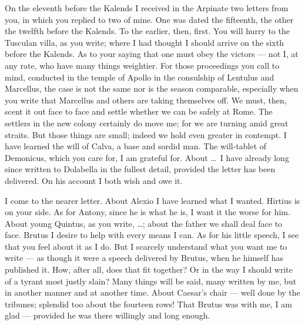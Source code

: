 

 On the eleventh before the Kalends I received in the Arpinate two letters from you, in which you replied to two of mine. One was dated the fifteenth, the other the twelfth before the Kalends. To the earlier, then, first. You will hurry to the Tusculan villa, as you write; where I had thought I should arrive on the sixth before the Kalends. As to your saying that one must obey the victors --- not I, at any rate, who have many things weightier. For those proceedings you call to mind, conducted in the temple of Apollo in the consulship of Lentulus and Marcellus, the case is not the same nor is the season comparable, especially when you write that Marcellus and others are taking themselves off. We must, then, scent it out face to face and settle whether we can be safely at Rome. The settlers in the new colony certainly do move me; for we are turning amid great straits. But those things are small; indeed we hold even greater in contempt. I have learned the will of Calva, a base and sordid man. The will-tablet of Demonicus, which you care for, I am grateful for. About \dots\ I have already long since written to Dolabella in the fullest detail, provided the letter has been delivered. On his account I both wish and owe it.

 I come to the nearer letter. About Alexio I have learned what I wanted. Hirtius is on your side. As for Antony, since he is what he is, I want it the worse for him. About young Quintus, as you write, \dots; about the father we shall deal face to face. Brutus I desire to help with every means I can. As for his little speech, I see that you feel about it as I do. But I scarcely understand what you want me to write --- as though it were a speech delivered by Brutus, when he himself has published it. How, after all, does that fit together? Or in the way I should write of a tyrant most justly slain? Many things will be said, many written by me, but in another manner and at another time. About Caesar's chair --- well done by the tribunes; splendid too about the fourteen rows! That Brutus was with me, I am glad --- provided he was there willingly and long enough.
